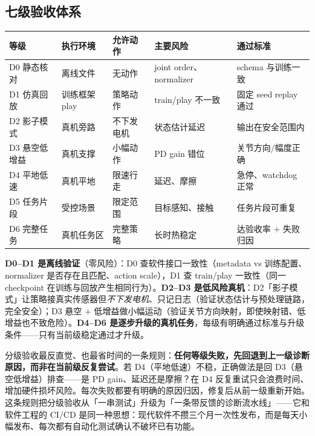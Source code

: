 \subsection{七级验收体系}
\label{sec:rlmc-s2r-seven-levels}

\begin{center}
\small
\begin{tabular}{@{}llp{2.4cm}p{2.6cm}p{2.8cm}@{}}
\toprule
等级 & 执行环境 & 允许动作 & 主要风险 & 通过标准 \\
\midrule
D0 静态核对 & 离线文件 & 无动作 & joint order、normalizer & schema 与训练一致 \\
D1 仿真回放 & 训练框架 play & 策略动作 & train/play 不一致 & 固定 seed replay 通过 \\
D2 影子模式 & 真机旁路 & 不下发电机 & 状态估计延迟 & 输出在安全范围内 \\
D3 悬空低增益 & 真机支撑 & 小幅动作 & PD gain 错位 & 关节方向/幅度正确 \\
D4 平地低速 & 真机平地 & 限速行走 & 延迟、摩擦 & 急停、watchdog 正常 \\
D5 任务片段 & 受控场景 & 限定范围 & 目标感知、接触 & 任务片段可重复 \\
D6 完整任务 & 真机任务区 & 完整策略 & 长时热稳定 & 达验收率 $+$ 失败归因 \\
\bottomrule
\end{tabular}
\end{center}

\textbf{D0--D1 是离线验证}（零风险）：D0 查软件接口一致性（metadata vs 训练配置、normalizer 是否存在且匹配、action scale），D1 查 train/play 一致性（同一 checkpoint 在训练与回放产生相同行为）。\textbf{D2--D3 是低风险真机}：D2「影子模式」让策略接真实传感器但\emph{不下发电机}、只记日志（验证状态估计与预处理链路，完全安全）；D3 悬空 $+$ 低增益做小幅运动（验证关节方向映射，即使映射错、低增益也不致危险）。\textbf{D4--D6 是逐步升级的真机任务}，每级有明确通过标准与升级条件——只有当前级稳定通过才升级。

\begin{insight}\label{ins:rlmc-s2r-grading}
分级验收最反直觉、也最省时间的一条规则：\textbf{任何等级失败，先回退到上一级诊断原因，而非在当前级反复尝试}。若 D4（平地低速）不稳，正确做法是回 D3（悬空低增益）排查——是 PD gain、延迟还是摩擦？在 D4 反复重试只会浪费时间、增加硬件损坏风险。每次失败都要有明确的原因归因，修复后从前一级重新开始。这条规则把分级验收从「一串测试」升级为「一条带反馈的诊断流水线」——它和软件工程的 CI/CD 是同一种思想：现代软件不攒三个月一次性发布，而是每天小幅发布、每次都有自动化测试确认不破坏已有功能。
\end{insight}

